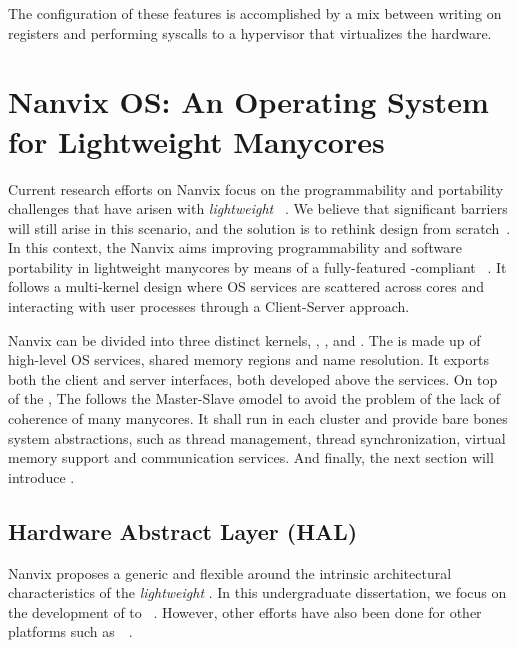 	The configuration of these features is accomplished by a mix between
	writing on \dma registers and performing syscalls to a hypervisor
	that virtualizes the \mppa hardware.

\section{Nanvix OS: An Operating System for Lightweight Manycores}
\label{sec.nanvix}

	Current research efforts on Nanvix \os focus on the programmability and portability
	challenges that have arisen with \textit{lightweight \manycores}~\cite{christgau2017, gamell2012, serres2011}.
	We believe that significant barriers will still arise in this scenario, and the
	solution is to rethink \os design from scratch~\cite{penna:compas19, penna2019}. 
	In this context, the Nanvix \os aims improving programmability and
	software portability in lightweight manycores by means of a fully-featured
	\posix-compliant \os~\cite{penna:compas19}.
	It follows a multi-kernel design where OS services are scattered across cores and
	interacting with user processes through a Client-Server approach.
	
	Nanvix \os can be divided into three distinct kernels, \multikernel,
	\microkernel, and \hal.
	The \multikernel is made up of high-level OS services, \eg shared memory
	regions and name resolution.
	It exports both the client and server interfaces, both developed above
	the \microkernel services.
	On top of the \hal, The \microkernel follows the Master-Slave \o model
	to avoid the problem of the lack of coherence of many manycores.
	It shall run in each cluster and provide bare bones system abstractions,
	such as thread management, thread synchronization,
	virtual memory support and communication services.
	And finally, the next section will introduce \hal.

	\subsection{Hardware Abstract Layer (HAL)}
	\label{sec.hal}

		Nanvix \os proposes a generic and flexible \hal around the
		intrinsic architectural characteristics of the \textit{lightweight \manycores}.
		In this undergraduate dissertation, we  focus on the development of \hal
		to \mppa~\cite{DeDinechin2013-1}.
		However, other efforts have also been done for other platforms such
		as~\optimsoc~\cite{Wallentowitz2013}.

